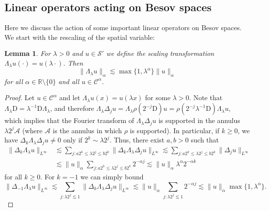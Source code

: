 \documentclass[11pt,a4paper]{article}
\newcommand{\mathD}{\mathrm{D}}
\newtheorem{lemma}[theorem]{Lemma}
\theoremstyle{remark}
\newcommand{\CA}{\ensuremath{\mathscr{A}}}
\newcommand{\CC}{\ensuremath{\mathscr{C}}}
\newcommand{\CS}{\ensuremath{\mathscr{S}}}
\begin{document}
\subsection{Linear operators acting on Besov spaces}

Here we discuss the action of some important linear operators on Besov spaces. We start with the rescaling of the spatial variable:

\begin{lemma}\label{lemma:scaling}
  For $\lambda >0$ and $u \in \CS'$ we define the scaling transformation $\Lambda_{\lambda} u ( \cdot ) =u ( \lambda \cdot )$. Then
  \[
     \| \Lambda_{\lambda} u \|_{\alpha} \lesssim \max\{1, \lambda^{\alpha} \} \| u \|_{\alpha}
  \]
  for all $\alpha \in \mathbb{R} \setminus \{ 0 \}$ and all $u \in \CC^{\alpha}$.
\end{lemma}

\begin{proof}
  Let $u \in \CC^{\alpha}$ and let $\Lambda_{\lambda} u ( x ) =u ( \lambda x )$ for some $\lambda >0$. Note that $\Lambda_{\lambda} \mathD =  \lambda^{-1} \mathD \Lambda_{\lambda}$, and therefore $\Lambda_{\lambda} \Delta_{j} u= \Lambda_{\lambda} \rho ( 2^{-j} \mathD ) u= \rho ( 2^{-j} \lambda^{-1} \mathD ) \Lambda_{\lambda} u$, which implies that the Fourier transform of $\Lambda_{\lambda} \Delta_{j} u$ is supported in the annulus $\lambda 2^{j} \CA$ (where $\CA$ is the annulus in which $\rho$ is supported). In particular, if $k \geqslant 0$, we have $\Delta_{k} \Lambda_{\lambda} \Delta_{j} u \neq 0$ only if $2^{k} \sim \lambda 2^{j}$. Thus, there exist $a,b>0$ such that
  \begin{align*}
     \| \Delta_{k} \Lambda_{\lambda} u \|_{L^{\infty}} & \lesssim \sum_{j:a2^{k} \leqslant \lambda 2^{j} \leqslant b2^{k}} \| \Delta_{k} \Lambda_{\lambda} \Delta_{j} u \|_{L^{\infty}} \lesssim \sum_{j:a2^{k} \leqslant \lambda 2^{j} \leqslant b2^{k}} \| \Delta_{j} u \|_{L^{\infty}} \\
     & \lesssim \| u \|_{\alpha} \sum_{j:a2^{k} \leqslant \lambda 2^{j} \leqslant b2^{k}} 2^{- \alpha j} \lesssim \| u \|_{\alpha} \lambda^{\alpha} 2^{- \alpha k} 
  \end{align*}
  for all $k \geqslant 0$. For $k=-1$ we can simply bound
  \[
     \| \Delta_{-1} \Lambda_{\lambda} u \|_{L^{\infty}} \lesssim \sum_{j: \lambda 2^{j} \lesssim 1} \| \Delta_{k} \Lambda_{\lambda} \Delta_{j} u \|_{L^{\infty}} \lesssim \| u \|_{\alpha} \sum_{j: \lambda 2^{j} \lesssim 1} 2^{- \alpha j} \lesssim \| u \|_{\alpha} \max\{1, \lambda^{\alpha} \}.
  \]
\end{proof}
\end{document}
